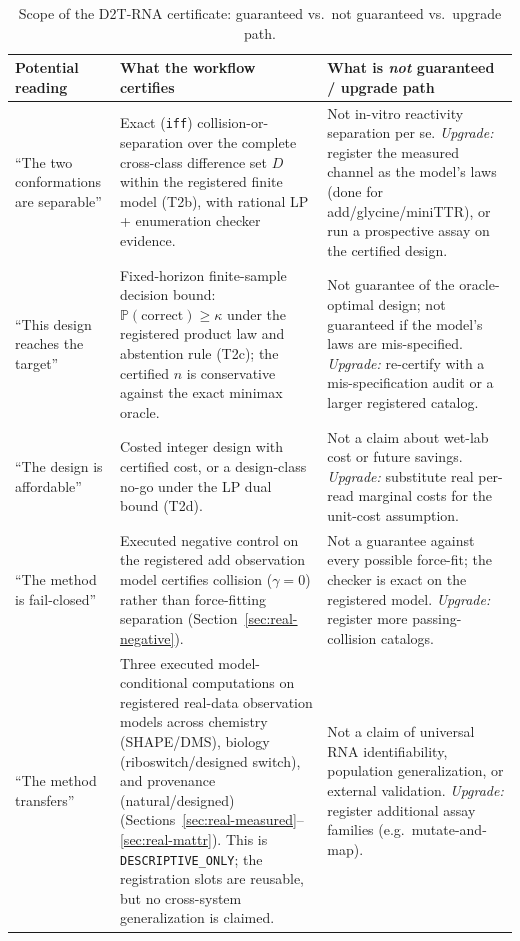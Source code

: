 \documentclass[11pt]{article}
\begin{document}
\begin{table}[ht]
\centering
\caption{Scope of the D2T-RNA certificate: guaranteed vs.\ not guaranteed vs.\ upgrade path.}
\label{tab:scope}
\small
\begin{tabular}{@{}p{3.0cm}p{4.6cm}p{4.6cm}@{}}
\toprule
\textbf{Potential reading} & \textbf{What the workflow certifies} & \textbf{What is \emph{not} guaranteed / upgrade path} \\
\midrule
``The two conformations are separable'' & Exact (\texttt{iff}) collision-or-separation over the complete cross-class difference set $D$ within the registered finite model (T2b), with rational LP + enumeration checker evidence. & Not in-vitro reactivity separation per se. \emph{Upgrade:} register the measured channel as the model's laws (done for add/glycine/miniTTR), or run a prospective assay on the certified design. \\
``This design reaches the target'' & Fixed-horizon finite-sample decision bound: $\mathbb{P}(\mathrm{correct})\ge\kappa$ under the registered product law and abstention rule (T2c); the certified $n$ is conservative against the exact minimax oracle. & Not guarantee of the oracle-optimal design; not guaranteed if the model's laws are mis-specified. \emph{Upgrade:} re-certify with a mis-specification audit or a larger registered catalog. \\
``The design is affordable'' & Costed integer design with certified cost, or a design-class no-go under the LP dual bound (T2d). & Not a claim about wet-lab cost or future savings. \emph{Upgrade:} substitute real per-read marginal costs for the unit-cost assumption. \\
``The method is fail-closed'' & Executed negative control on the registered add observation model certifies collision ($\gamma=0$) rather than force-fitting separation (Section~\ref{sec:real-negative}). & Not a guarantee against every possible force-fit; the checker is exact on the registered model. \emph{Upgrade:} register more passing-collision catalogs. \\
``The method transfers'' & Three executed model-conditional computations on registered real-data observation models across chemistry (SHAPE/DMS), biology (riboswitch/designed switch), and provenance (natural/designed) (Sections~\ref{sec:real-measured}--\ref{sec:real-mattr}). This is \texttt{DESCRIPTIVE\_ONLY}; the registration slots are reusable, but no cross-system generalization is claimed. & Not a claim of universal RNA identifiability, population generalization, or external validation. \emph{Upgrade:} register additional assay families (e.g.\ mutate-and-map). \\
\bottomrule
\end{tabular}
\end{table}
\end{document}
